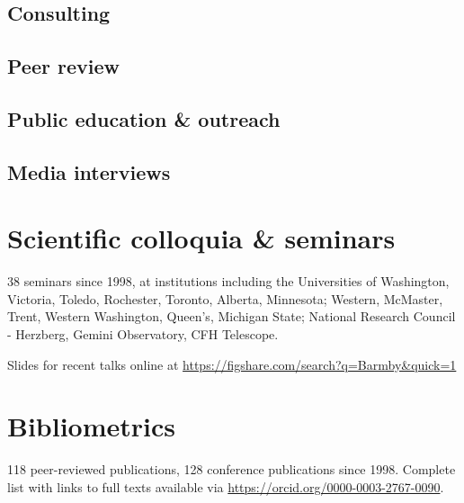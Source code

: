 \documentclass[12pt]{article}
\begin{document}
\subsection{Consulting}


\vspace{0.8cm}

\subsection{Peer review}


\subsection{Public education \& outreach}


\subsection{Media interviews}


\section{Scientific colloquia \& seminars}

38 seminars since 1998, at institutions including the Universities of Washington, Victoria, Toledo, Rochester, Toronto, Alberta, Minnesota; Western, McMaster, Trent, Western Washington, Queen's, Michigan State; National Research Council - Herzberg, Gemini Observatory, CFH Telescope.

\vspace{0.5cm}
Slides for recent talks online at \url{https://figshare.com/search?q=Barmby&quick=1}

\section{Bibliometrics}

118 peer-reviewed publications, 128 conference publications since 1998.
Complete list with links to full texts available via \url{https://orcid.org/0000-0003-2767-0090}.

\vspace{0.5cm}


\begin{publications}
\printbibliography[title={Selected publications},keyword=select]
\end{publications}
\end{document}
